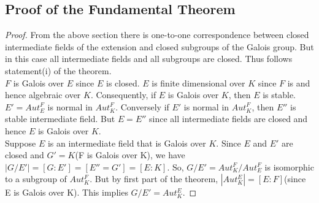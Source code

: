         \subsection{Proof of the Fundamental Theorem}
        \begin{proof}
From the above section there is one-to-one correspondence between closed intermediate fields of the extension and closed subgroups of the Galois group. But in this case all intermediate fields and all subgroups are closed. Thus follows statement(i) of the theorem.\\

        \(F\) is Galois over \(E\) since \(E\) is closed. \(E\) is finite dimensional over \(K\) since \(F\) is and hence algebraic over \(K\). Consequently, if \(E\) is Galois over \(K\), then \(E\) is stable.
        \(E'=Aut_E^F\) is normal in \(Aut_K^F\). Conversely if \(E'\) is normal in \(Aut_K^F\), then \(E''\) is stable intermediate field. But \(E=E''\) since all intermediate fields are closed and hence \(E\) is Galois over \(K\).\\

       Suppose \(E\) is an intermediate field that is Galois over \(K\). Since \(E\) and \(E'\) are closed and \(G'=K\)(F is Galois over K), we have \(|G/E'|=[G:E']=[E''=G']=[E:K]\). So, \(G/E'=Aut_K^F/Aut_E^F\) is isomorphic to a subgroup of \(Aut_K^F\). But by first part of the theorem, \(|Aut_K^E|=[E:F]\)(since E is Galois over K). This implies \(G/E'=Aut_K^E\).
        \end{proof}


